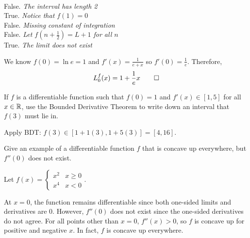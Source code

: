 \documentclass{agony}
\begin{document}
\setcounter{question}{5}
 \\
False. \emph{The interval has length 2}
 \\
True. \emph{Notice that $f(1) = 0$}
 \\
False. \emph{Missing constant of integration}
 \\
False. \emph{Let $f(n+\frac12) = L+1$ for all $n$}
 \\
True. \emph{The limit does not exist}



\begin{sol}
  We know $f(0) = \ln e = 1$ and $f'(x) = \frac{1}{e+x}$ so $f'(0) = \frac{1}{e}$. Therefore,
  \[ L_0^f(x) = 1 + \frac{1}{e}x \qedhere \]
\end{sol}

\begin{prob}
  If $f$ is a differentiable function such that $f(0) = 1$ and $f'(x)\in[1,5]$ for all $x\in\mathbb{R}$,
  use the Bounded Derivative Theorem to write down an interval that $f(3)$ must lie in.
\end{prob}
\begin{sol}
  Apply BDT\@: $f(3) \in [1+1(3),1+5(3)] = [4,16]$.
\end{sol}

\begin{prob}
  Give an example of a differentiable function $f$ that is concave up everywhere,
  but $f''(0)$ does not exist.
\end{prob}
\begin{sol}
  Let $f(x) = \begin{cases} x^2 & x \geq 0 \\ x^4 & x < 0 \end{cases}$.

  At $x=0$, the function remains differentiable since both one-sided limits and derivatives are 0.
  However, $f''(0)$ does not exist since the one-sided derivatives do not agree.
  For all points other than $x=0$, $f''(x) > 0$, so $f$ is concave up for positive and negative $x$.
  In fact, $f$ is concave up everywhere.
\end{sol}
\end{document}
